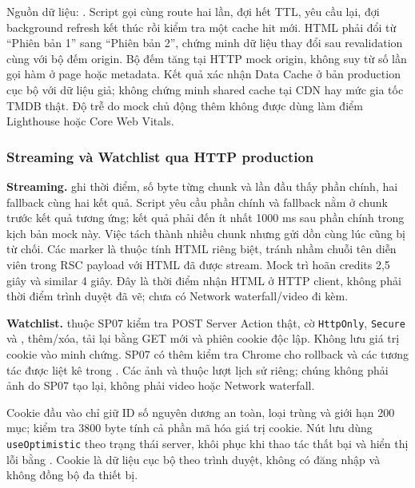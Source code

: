 \documentclass[12pt,a4paper]{extarticle}
\begin{document}
Nguồn dữ liệu: . Script gọi cùng route hai lần, đợi hết TTL, yêu cầu lại, đợi background refresh kết thúc rồi kiểm tra một cache hit mới. HTML phải đổi từ ``Phiên bản 1'' sang ``Phiên bản 2'', chứng minh dữ liệu thay đổi sau revalidation cùng với bộ đếm origin. Bộ đếm tăng tại HTTP mock origin, không suy từ số lần gọi hàm ở page hoặc metadata. Kết quả xác nhận Data Cache ở bản production cục bộ với dữ liệu giả; không chứng minh shared cache tại CDN hay mức gia tốc TMDB thật. Độ trễ do mock chủ động thêm không được dùng làm điểm Lighthouse hoặc Core Web Vitals.

\subsubsection{Streaming và Watchlist qua HTTP production}
\textbf{Streaming.}  ghi thời điểm, số byte từng chunk và lần đầu thấy phần chính, hai fallback cùng hai kết quả. Script yêu cầu phần chính và fallback nằm ở chunk trước kết quả tương ứng; kết quả phải đến ít nhất 1000 ms sau phần chính trong kịch bản mock này. Việc tách thành nhiều chunk nhưng gửi dồn cùng lúc cũng bị từ chối. Các marker là thuộc tính HTML riêng biệt, tránh nhầm chuỗi tên diễn viên trong RSC payload với HTML đã được stream. Mock trì hoãn credits 2,5 giây và similar 4 giây. Đây là thời điểm nhận HTML ở HTTP client, không phải thời điểm trình duyệt đã vẽ; chưa có Network waterfall/video đi kèm.

\textbf{Watchlist.}  thuộc SP07 kiểm tra POST Server Action thật, cờ \texttt{HttpOnly}, \texttt{Secure} và , thêm/xóa, tải lại bằng GET mới và phiên cookie độc lập. Không lưu giá trị cookie vào minh chứng. SP07 có thêm kiểm tra Chrome cho rollback và các tương tác được liệt kê trong . Các ảnh  và  thuộc lượt lịch sử riêng; chúng không phải ảnh do SP07 tạo lại, không phải video hoặc Network waterfall.

Cookie đầu vào chỉ giữ ID số nguyên dương an toàn, loại trùng và giới hạn 200 mục; kiểm tra 3800 byte tính cả phần mã hóa giá trị cookie. Nút lưu dùng \texttt{useOptimistic} theo trạng thái server, khôi phục khi thao tác thất bại và hiển thị lỗi bằng . Cookie là dữ liệu cục bộ theo trình duyệt, không có đăng nhập và không đồng bộ đa thiết bị.
\end{document}
